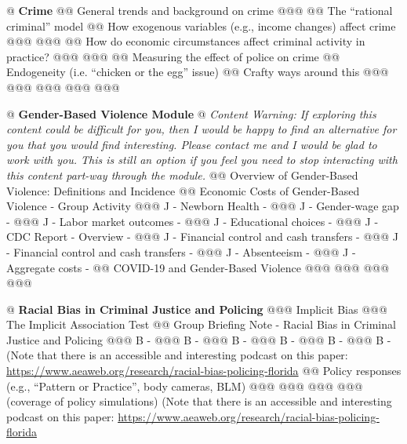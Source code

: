 \documentclass[11pt,letterpaper,final]{article}
\begin{document}
{@ \textbf{Crime}
@@ General trends and background on crime
@@@ \citet{Dills2010}
@@ The ``rational criminal'' model
@@ How exogenous variables (e.g., income changes) affect crime
@@@ 
@@@ \citet{Marie2014}
@@ How do economic circumstances affect criminal activity in practice?
@@@ \citet{Yang2017a}
@@@ \citet{Palmer2019}
@@ Measuring the effect of police on crime
@@ Endogeneity (i.e. ``chicken or the egg'' issue)
@@ Crafty ways around this
@@@ \citet{Levitt1997}
@@@ \citet{DiTella2004}
@@@ \citet{Dur2019}
@@@ \citet{Cheng2018}
@@@ \citet{Sullivan2017}

@ \textbf{Gender-Based Violence Module}
@ \textit{Content Warning: If exploring this content could be difficult for you, then I would be happy to find an alternative for you that you would find interesting. Please contact me and I would be glad to work with you. This is still an option if you feel you need to stop interacting with this content part-way through the module.}
@@ Overview of Gender-Based Violence: Definitions and Incidence
@@ Economic Costs of Gender-Based Violence - Group Activity
@@@ J - Newborn Health - \citet{Aizer2011}
@@@ J - Gender-wage gap - \citet{Aizer2010}
@@@ J - Labor market outcomes - \citet{Sabia2013}
@@@ J - Educational choices - \citet{Borker2018}
@@@ J - CDC Report - Overview - \citet{NCIPC2003}
@@@ J - Financial control and cash transfers - \citet{Bobonis2013}
@@@ J - Financial control and cash transfers - \citet{Hidrobo2013}
@@@ J - Absenteeism - \citet{Reeves2007}
@@@ J - Aggregate costs - \citet{Max2004}
@@ COVID-19 and Gender-Based Violence
@@@ \citet{Ravindran2020}
@@@ \citet{Bullinger2020}
@@@ \citet{Leslie2020}
@@@ \citet{Silverio-Murillo2020}

@ \textbf{Racial Bias in Criminal Justice and Policing}
@@@ Implicit Bias
@@@ The Implicit Association Test
@@ Group Briefing Note - Racial Bias in Criminal Justice and Policing
@@@ B - \citet{Arnold2018}
@@@ B - \citet{Hoekstra2020}
@@@ B - \citet{Antonovics2009}
@@@ B - \citet{Sloan2020}
@@@ B - \citet{Eren2018}
@@@ B - \citet{Goncalves2021} (Note that there is an accessible and interesting podcast on this paper: \url{https://www.aeaweb.org/research/racial-bias-policing-florida}
@@ Policy responses (e.g., ``Pattern or Practice'', body cameras, BLM)
@@@ \citet{Devi2020} 
@@@ \citet{Cubukcu2021}
@@@ \citet{Campbell2021}
@@@ \citet{Goncalves2021} (coverage of policy simulations) (Note that there is an accessible and interesting podcast on this paper: \url{https://www.aeaweb.org/research/racial-bias-policing-florida}

}
\end{document}

